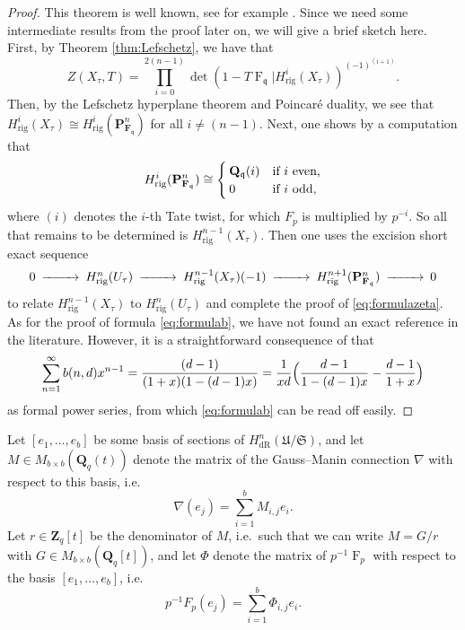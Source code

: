 \documentclass[a4paper,11pt]{article}
\numberwithin{equation}{section}
\newcommand{\ZZ}{\mathbf{Z}} %
\newcommand{\QQ}{\mathbf{Q}} %
\newcommand{\FF}{\mathbf{F}} %
\DeclareMathOperator{\Frob}{F}           %
\providecommand{\HdR}{H_{\text{dR}}}    %
\providecommand{\Hrig}{H_{\text{rig}}}  %
\theoremstyle{definition}
\begin{document}
\begin{proof}
This theorem is well known, see for example \cite{AbbottKedlayaRoe2006}. Since we need some intermediate results from the
proof later on, we will give a brief sketch here. First, by Theorem \ref{thm:Lefschetz}, we have that
\[
Z(X_{\tau},T) = \prod_{i=0}^{2(n-1)} \det(1- T \Frob_{\mathfrak{q}} | \Hrig^i(X_{\tau}))^{(-1)^{(i+1)}}.
\]
Then, by the Lefschetz hyperplane theorem and Poincar\'e duality, we see that $\Hrig^i(X_{\tau}) \cong \Hrig^i(\mathbf{P}^n_{\FF_{\mathfrak{q}}})$ 
for all $i \neq (n-1)$. Next, one shows by a computation that
\begin{equation} \label{eqn:projcoho}
\Hrig^i(\mathbf{P}^n_{\FF_{\mathfrak{q}}}) 
\cong 
\begin{cases}
\QQ_{\mathfrak{q}}(i) &\mbox{if $i$ even,} \\
$0$ &\mbox{if $i$ odd,} 
\end{cases} 
\end{equation}
where $(i)$ denotes the $i$-th Tate twist, for which $F_p$ is multiplied by $p^{-i}$. So all that remains to be determined is $\Hrig^{n-1}(X_{\tau})$. 
Then one uses the excision short exact sequence
\begin{equation} \label{eqn:excision}
\begin{CD}
0 @>>> \Hrig^{n}(U_{\tau}) @>>> \Hrig^{n-1}(X_{\tau})(-1) @>>> \Hrig^{n+1}(\mathbf{P}^n_{\FF_{\mathfrak{q}}}) @>>> 0
\end{CD} 
\end{equation}
to relate $\Hrig^{n-1}(X_{\tau})$ to $\Hrig^{n}(U_{\tau})$ and complete the proof of \eqref{eq:formulazeta}. As for 
the proof of formula \eqref{eq:formulab}, we have not found an exact reference in the literature. However, it is
a straightforward consequence of \cite[Corollaire 2.4 (i)]{sga7} that
\[
\sum_{n=1}^{\infty} b(n,d) x^{n-1} = \frac{(d-1)}{(1+x)(1-(d-1)x)} = \frac{1}{xd} \Bigl( \frac{d-1}{1-(d-1)x} - \frac{d-1}{1+x} \Bigr)
\] 
as formal power series, from which \eqref{eq:formulab} can be read off easily. 
\end{proof}

Let $[e_1, \ldots, e_b]$ be some basis of sections of $\HdR^n(\mathfrak{U}/\mathfrak{S})$, and let 
$M \in M_{b \times b}(\QQ_q(t))$ denote the matrix of the Gauss--Manin connection $\nabla$ with respect 
to this basis, i.e.\ 
\[
\nabla (e_j) = \sum_{i=1}^b M_{i,j} e_i.
\]
Let $r \in \ZZ_q[t]$ be the denominator of $M$, i.e.\ such that we can write $M=G/r$ with $G \in M_{b \times b}(\QQ_q[t])$, 
and let $\Phi$ denote the matrix of $p^{-1}\Frob_p$ with respect to the basis $[e_1, \ldots, e_b]$, i.e.\
\[
p^{-1} F_p (e_j) = \sum_{i=1}^b \Phi_{i,j} e_i.
\]
\end{document}
